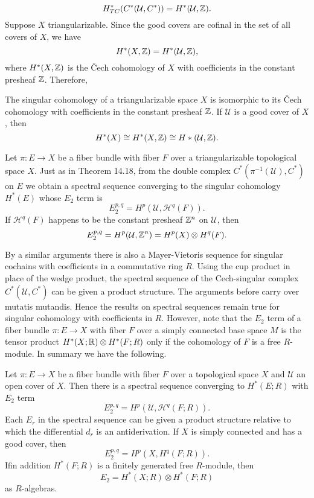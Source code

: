 \[H^*_{TC}(C^*(\mathcal{U},C^*))=H^*(\mathcal{U},\mathbb{Z}).\]
Suppose $X$ triangularizable. Since the good covers are cofinal in the set of all covers of $X$, we have
\[H^*(X,\mathbb{Z})=H^*(\mathcal{U},\mathbb{Z}),\]
where $H^*(X,\mathbb{Z})$ is the \v{C}ech cohomology of $X$ with coefficients in the constant presheaf $\mathbb{Z}$. Therefore,
\begin{theorem}
The singular cohomology of a triangularizable space $X$ is isomorphic to its \v{C}ech cohomology with coefficients in the constant presheaf $\mathbb{Z}$. If $\mathcal{U}$ is a 
good cover of $X$, then
\[H^*(X)\cong H^*(X,\mathbb{Z})\cong H*(\mathcal{U},\mathbb{Z}).\]
\end{theorem}
Let $\pi:E\to X$ be a fiber bundle with fiber $F$ over a triangularizable topological space $X$. Just as in Theorem 14.18, from the double complex $C^*(\pi^{-1}(\mathcal{U}),C^*)$ 
on $E$ we obtain a spectral sequence converging to the singular cohomology $H^*(E)$ whose $E_2$ term is
\[E_2^{p,q}=H^p(\mathcal{U},\mathscr{H}^q(F)).\]
If $\mathscr{H}^q(F)$ happens to be the constant presheaf $\mathbb{Z}^n$ on $\mathcal{U}$, then
\[E_2^{p,q}=H^p(\mathcal{U},\mathbb{Z}^n)=H^p(X)\otimes H^q(F).\]

By a similar arguments there is also a Mayer-Vietoris sequence for singular cochains with coefficients in a commutative ring $R$. Using the cup product in place of the 
wedge product, the spectral sequence of the Cech-singular complex $C^*(\mathcal{U},C^*)$ can be given a product structure. The arguments before carry over mutatis 
mutandis. Hence the results on spectral sequences remain true for singular cohomology with coefficients in $R$. However, note that the $E_2$ term of a fiber bundle 
$\pi:E\to X$ with fiber $F$ over a simply connected base space $M$ is the tensor product $H^*(X;\mathbb{R})\otimes H^*(F;R)$ only if the cohomology of $F$ is a free $R$-module. 
In summary we have the following.
\begin{theorem}
Let $\pi:E\to X$ be a fiber bundle with fiber $F$ over a topological space $X$ and $\mathcal{U}$ an open cover of $X$. Then there is a spectral sequence converging to 
$H^*(E;R)$ with $E_2$ term
\[E_2^{p,q}=H^p(\mathcal{U},\mathscr{H}^q(F;R)).\]
Each $E_r$ in the spectral sequence can be given a product structure relative to which the differential $d_r$ is an antiderivation. If $X$ is simply connected and has
a good cover, then
\[E_2^{p,q}=H^p(X,H^q(F;R)).\]
Ifin addition $H^*(F;R)$ is a finitely generated free $R$-module, then
\[E_2=H^*(X;R)\otimes H^*(F;R)\]
as $R$-algebras.
\end{theorem}
